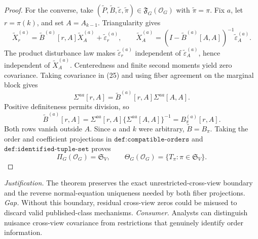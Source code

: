 \documentclass{article}
\begin{document}
\begin{proof}
For the converse, take \((\widetilde P,\widetilde B,\widetilde\varepsilon,\widetilde\pi)\in\mathfrak F_G(\mathcal O_G)\) with \(\widetilde\pi=\pi\).  Fix \(a\), let \(r=\pi(k)\), and set \(A=A_{k-1}\).  Triangularity gives
\[
 \widetilde X_r^{(a)}
 =\widetilde B^{(a)}[r,A]\widetilde X_A^{(a)}
 +\widetilde\varepsilon_r^{(a)},
 \qquad
 \widetilde X_A^{(a)}
 =(I-\widetilde B^{(a)}[A,A])^{-1}
 \widetilde\varepsilon_A^{(a)}.
 \tag{25}
\]
The product disturbance law makes \(\widetilde\varepsilon_r^{(a)}\) independent of \(\widetilde\varepsilon_A^{(a)}\), hence independent of \(\widetilde X_A^{(a)}\).  Centeredness and finite second moments yield zero covariance.  Taking covariance in (25) and using fiber agreement on the marginal block gives
\[
 \Sigma^{aa}[r,A]
 =\widetilde B^{(a)}[r,A]\Sigma^{aa}[A,A].
\]
Positive definiteness permits division, so
\[
 \widetilde B^{(a)}[r,A]
 =\Sigma^{aa}[r,A]\{\Sigma^{aa}[A,A]\}^{-1}
 =B_\pi^{(a)}[r,A].
 \tag{26}
\]
Both rows vanish outside \(A\).  Since \(a\) and \(k\) were arbitrary, \(\widetilde B=B_\pi\).  Taking the order and coefficient projections in \(\texttt{def:compatible-orders}\) and \(\texttt{def:identified-tuple-set}\) proves
\[
 \Pi_G(\mathcal O_G)=\mathfrak S_V,
 \qquad \Theta_G(\mathcal O_G)=\{T_\pi:\pi\in\mathfrak S_V\}.
\]
\end{proof}
\par\smallskip\noindent \textit{Justification.} The theorem preserves the exact unrestricted-cross-view boundary and the reverse normal-equation uniqueness needed by both fiber projections. \textit{Gap.} Without this boundary, residual cross-view zeros could be misused to discard valid published-class mechanisms. \textit{Consumer.} Analysts can distinguish nuisance cross-view covariance from restrictions that genuinely identify order information.
\end{document}
